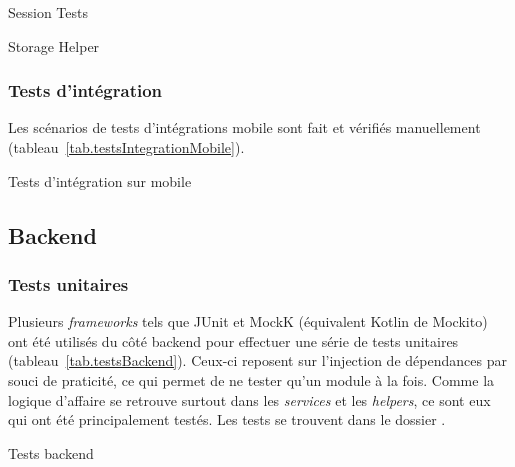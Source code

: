         \begin{table}[hp]
            \centering
            \caption{Session Tests}
            
            \label{tab.testsSession}
        \end{table}

        \begin{table}[hp]
            \centering
            \caption{Storage Helper}
            
            \label{tab.testsStorage}
        \end{table}
                
        \subsubsection{Tests d'intégration}
        Les scénarios de tests d'intégrations mobile sont fait et vérifiés manuellement (tableau~\ref{tab.testsIntegrationMobile}).

        \begin{table}[hp]
            \centering
            \caption{Tests d'intégration sur mobile}
            
            \label{tab.testsIntegrationMobile}
        \end{table}
                
    \subsection{Backend}
        \subsubsection{Tests unitaires}
        Plusieurs \emph{frameworks} tels que JUnit et MockK (équivalent Kotlin de Mockito) ont été utilisés du côté backend pour effectuer une série de tests unitaires (tableau~\ref{tab.testsBackend}). Ceux-ci reposent sur l'injection de dépendances par souci de praticité, ce qui permet de ne tester qu'un module à la fois. Comme la logique d'affaire se retrouve surtout dans les \emph{services} et les \emph{helpers}, ce sont eux qui ont été principalement testés. Les tests se trouvent  dans le dossier .

        \begin{table}[hp]
            \centering
            \caption{Tests backend}
            
            \label{tab.testsBackend}
        \end{table}
        
